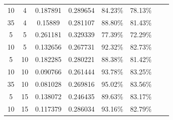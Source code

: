 \documentclass[12pt]{article}
\begin{document}
\begin{table}[h]
{\begin{tabular}{cccccccc}
10 & 4  & 0.187891 & 0.289654 & 84.23\% & 78.13\% \\
35 & 4  & 0.15889  & 0.281107 & 88.80\% & 81.43\% \\
5  & 5  & 0.261181 & 0.329339 & 77.39\% & 72.29\% \\
10 & 5  & 0.132656 & 0.267731 & 92.32\% & 82.73\% \\
5  & 10 & 0.182285 & 0.280221 & 88.38\% & 81.42\% \\
10 & 10 & 0.090766 & 0.261444 & 93.78\% & 83.25\% \\
35 & 10 & 0.081028 & 0.269816 & 95.02\% & 83.56\% \\
5  & 15 & 0.138072 & 0.246435 & 89.63\% & 83.17\% \\
10 & 15 & 0.117379 & 0.286034 & 93.16\% & 82.79\% \\
\hline
\end{tabular}
}
\end{table}
\end{document}
